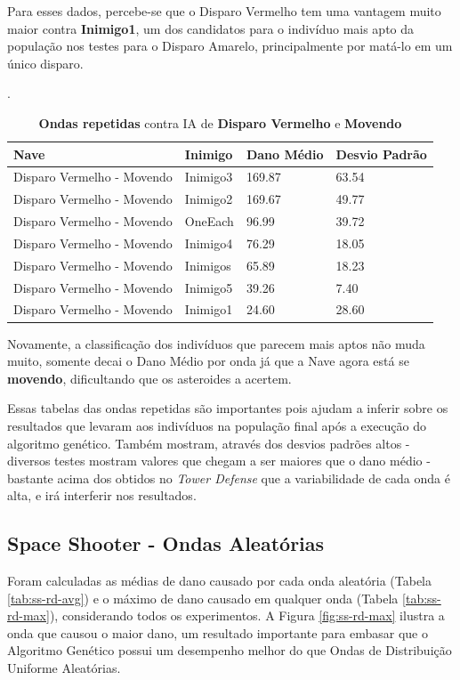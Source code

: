 Para esses dados, percebe-se que o Disparo Vermelho tem uma vantagem muito maior contra \textbf{Inimigo1}, um dos candidatos para o indivíduo mais apto da população nos testes para o Disparo Amarelo, principalmente por matá-lo em um único disparo.

\begin{table}
\centering
\caption{\textbf{Ondas repetidas} contra IA de \textbf{Disparo Vermelho} e \textbf{Movendo}}.
\begin{tabular}{l|l|ll}
Nave                       & Inimigo  & Dano Médio & Desvio Padrão \\ \hline
Disparo Vermelho - Movendo & Inimigo3 & 169.87     & 63.54         \\
Disparo Vermelho - Movendo & Inimigo2 & 169.67     & 49.77         \\
Disparo Vermelho - Movendo & OneEach  & 96.99      & 39.72         \\
Disparo Vermelho - Movendo & Inimigo4 & 76.29      & 18.05         \\
Disparo Vermelho - Movendo & Inimigos & 65.89      & 18.23         \\
Disparo Vermelho - Movendo & Inimigo5 & 39.26      & 7.40          \\
Disparo Vermelho - Movendo & Inimigo1 & 24.60      & 28.60        
\end{tabular}
\label{tab:ss-red-move}
\end{table}

Novamente, a classificação dos indivíduos que parecem mais aptos não muda muito, somente decai o Dano Médio por onda já que a Nave agora está se \textbf{movendo}, dificultando que os asteroides a acertem.

Essas tabelas das ondas repetidas são importantes pois ajudam a inferir sobre os resultados que levaram aos indivíduos na população final após a execução do algoritmo genético. Também mostram, através dos desvios padrões altos - diversos testes mostram valores que chegam a ser maiores que o dano médio - bastante acima dos obtidos no \textit{Tower Defense} que a variabilidade de cada onda é alta, e irá interferir nos resultados.

\subsection{Space Shooter - Ondas Aleatórias}
\label{sec:rd-ss}

Foram calculadas as médias de dano causado por cada onda aleatória (Tabela \ref{tab:ss-rd-avg}) e o máximo de dano causado em qualquer onda (Tabela \ref{tab:ss-rd-max}), considerando todos os experimentos. A Figura \ref{fig:ss-rd-max} ilustra a onda que causou o maior dano, um resultado importante para embasar que o Algoritmo Genético possui um desempenho melhor do que Ondas de Distribuição Uniforme Aleatórias.

